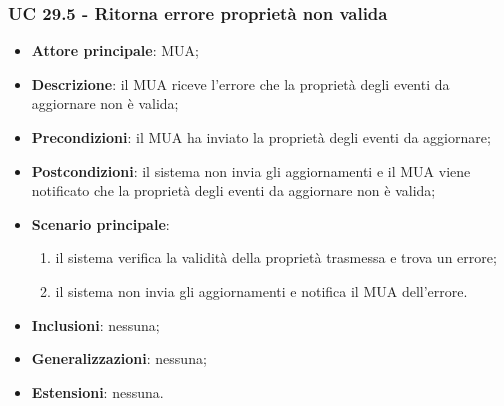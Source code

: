     \subsubsection{UC 29.5 - Ritorna errore proprietà non valida} \label{sec:UC29.5}
    \begin{itemize}
        \item \textbf{Attore principale}: MUA;
        \item \textbf{Descrizione}: il MUA riceve l'errore che la proprietà degli eventi da aggiornare non è valida;
        \item \textbf{Precondizioni}: il MUA ha inviato la proprietà degli eventi da aggiornare;
        \item \textbf{Postcondizioni}: il sistema non invia gli aggiornamenti e il MUA viene notificato che la proprietà degli eventi da aggiornare non è valida;
        \item \textbf{Scenario principale}:
            \begin{enumerate}
                \item il sistema verifica la validità della proprietà trasmessa e trova un errore;
                \item il sistema non invia gli aggiornamenti e notifica il MUA dell'errore.
            \end{enumerate}
        \item \textbf{Inclusioni}: nessuna;
        \item \textbf{Generalizzazioni}: nessuna;
        \item \textbf{Estensioni}: nessuna.
    \end{itemize}